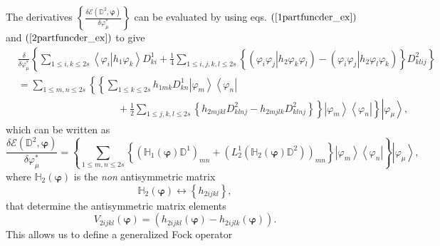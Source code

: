 \documentclass[aps,preprint]{revtex4}%
\begin{document}
The derivatives $\left\{  \frac{\delta\mathcal{E}\left(  \mathbb{D}%
^{2},\bm{\varphi}\right)  }{\delta\varphi_{\mu}^{\ast}}\right\}  $ can be
evaluated by using eqs. $\left(  \ref{1partfuncder_ex}\right)  $ and $\left(
\ref{2partfuncder_ex}\right)  $ to give
\begin{align}
&  \frac{\delta}{\delta\varphi_{\mu}^{\ast}}\left\{  \sum_{1\leq i,k\leq
2s}\left\langle \left.  \varphi_{i}\right\vert h_{1}\varphi_{k}\right\rangle
D_{ki}^{1}+\frac{1}{4}\sum_{1\leq i,j,k,l\leq2s}\left\{  \left(  \left.
\varphi_{i}\varphi_{j}\right\vert h_{2}\varphi_{k}\varphi_{l}\right)  -\left(
\left.  \varphi_{i}\varphi_{j}\right\vert h_{2}\varphi_{l}\varphi_{k}\right)
\right\}  D_{klij}^{2}\right\} \nonumber\\
&  =\sum_{1\leq m,n\leq2s}\left\{  \left\{  \sum_{1\leq k\leq2s}h_{1mk}%
D_{kn}^{1}\left\vert \varphi_{m}\right\rangle \left\langle \varphi
_{n}\right\vert \right.  \right. \nonumber\\
&  \qquad\qquad\qquad\qquad\qquad+\left.  \left.  \frac{1}{2}\sum_{1\leq
j,k,l\leq2s}\left\{  h_{2mjkl}D_{klnj}^{2}-h_{2mjlk}D_{klnj}^{2}\right\}
\right\}  \left\vert \varphi_{m}\right\rangle \left\langle \varphi
_{n}\right\vert \right\}  \left\vert \varphi_{\mu}\right\rangle ,
\end{align}
which can be written as
\begin{equation}
\frac{\delta\mathcal{E}\left(  \mathbb{D}^{2},\bm{\varphi}\right)  }%
{\delta\varphi_{\mu}^{\ast}}=\left\{  \sum_{1\leq m,n\leq2s}\left\{  \left(
\mathbb{H}_{1}\left(  \bm{\varphi}\right)  \mathbb{D}^{1}\right)
_{mn}+\left(  L_{2}^{1}\left(  \mathbb{H}_{2}\left(  \bm{\varphi}\right)
\mathbb{D}^{2}\right)  \right)  _{mn}\right\}  \left\vert \varphi
_{m}\right\rangle \left\langle \varphi_{n}\right\vert \right\}  \left\vert
\varphi_{\mu}\right\rangle ,
\end{equation}
where $\mathbb{H}_{2}\left(  \bm{\varphi}\right)  $ is the \emph{non
}antisymmetric matrix
\begin{equation}
\mathbb{H}_{2}\left(  \bm{\varphi}\right)  \leftrightarrow\left\{
h_{2ijkl}\right\}  ,
\end{equation}
that determine the antisymmetric matrix elements
\begin{equation}
V_{2ijkl}\left(  \bm{\varphi}\right)  =\left(  h_{2ijkl}\left(
\bm{\varphi}\right)  -h_{2ijlk}\left(  \bm{\varphi}\right)  \right)  .
\end{equation}
This allows us to define a generalized Fock operator
\end{document}
